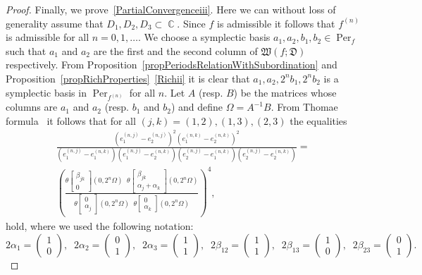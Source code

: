 \documentclass{amsart}
\numberwithin{equation}{section}
\theoremstyle{definition}
\theoremstyle{remark}
\DeclareMathOperator{\CC}{\mathbb C}
\DeclareMathOperator{\Per}{Per}
\begin{document}
\begin{proof}
		Finally, we prove~\ref{PartialConvergenceiii}. Here we can without loss of generality assume that $D_1,D_2,D_3 \subset \CC$. Since $f$ is admissible it follows that $f^{(n)}$ is admissible for all $n = 0,1,\dots$. We choose a symplectic basis $a_1,a_2,b_1,b_2 \in \Per_f$ such that $a_1$ and $a_2$ are the first and the second column of $\mathfrak W(f;\mathfrak D)$ respectively. From Proposition~\ref{propPeriodsRelationWithSubordination} and Proposition~\ref{propRichProperties}~\ref{Richii} it is clear that $a_1,a_2,2^nb_1,2^nb_2$ is a symplectic basis in $\Per_{f^{(n)}}$ for all $n$. Let $A$ (resp. $B$) be the matrices whose columns are $a_1$ and $a_2$ (resp. $b_1$ and $b_2$) and define $\Omega = A^{-1}B$. From Thomae formula~\cite[Theorem~III.8.1]{mumfordII} it follows that for all $(j,k) = (1,2),(1,3),(2,3)$ the equalities
		\[
		\begin{gathered}
			\frac{\left(e_1^{(n,j)} - e_2^{(n,j)}\right)^2\left(e_1^{(n,k)} - e_2^{(n,k)}\right)^2}{\left(e_1^{(n,j)} - e_1^{(n,k)}\right)\left(e_1^{(n,j)} - e_2^{(n,k)}\right)\left(e_2^{(n,j)} - e_1^{(n,k)}\right)\left(e_2^{(n,j)} - e_2^{(n,k)}\right)} = \\ \left(\frac{\theta \begin{bmatrix}
					\beta_{jk} \\ 0
				\end{bmatrix}(0,2^n\Omega)\;\;\theta \begin{bmatrix}
					\beta_{jk} \\ \alpha_j + \alpha_k
				\end{bmatrix}(0,2^n\Omega)}{\theta \begin{bmatrix}
					0 \\ \alpha_j
				\end{bmatrix}(0,2^n\Omega)\;\;\theta \begin{bmatrix}
					0 \\ \alpha_k
				\end{bmatrix}(0,2^n\Omega)}\right)^4, \end{gathered}\]
		hold, where we used the following notation:
		\[
		2\alpha_1 = \begin{pmatrix} 1 \\ 0 \end{pmatrix},\;\;2\alpha_2 = \begin{pmatrix} 0 \\ 1 \end{pmatrix},\;\;2\alpha_3 = \begin{pmatrix} 1 \\ 1 \end{pmatrix},\;\;2\beta_{12} = \begin{pmatrix} 1 \\ 1 \end{pmatrix},\;\;2\beta_{13} = \begin{pmatrix} 1 \\ 0 \end{pmatrix},\;\;2\beta_{23} = \begin{pmatrix} 0 \\ 1 \end{pmatrix}.
\]
\end{proof}
\end{document}
